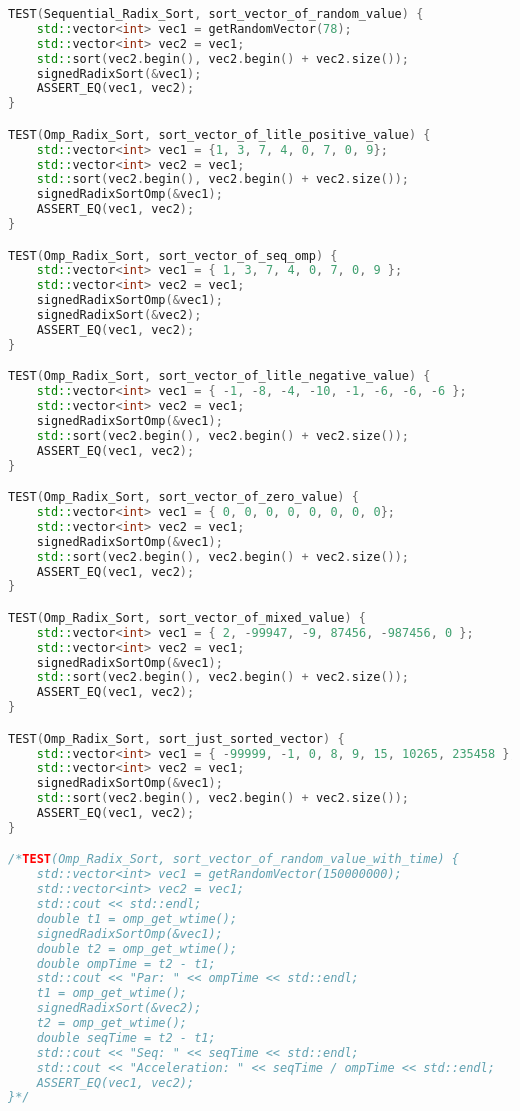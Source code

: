\documentclass{report}
\begin{document}
\begin{lstlisting}[language=C++]
TEST(Sequential_Radix_Sort, sort_vector_of_random_value) {
    std::vector<int> vec1 = getRandomVector(78);
    std::vector<int> vec2 = vec1;
    std::sort(vec2.begin(), vec2.begin() + vec2.size());
    signedRadixSort(&vec1);
    ASSERT_EQ(vec1, vec2);
}

TEST(Omp_Radix_Sort, sort_vector_of_litle_positive_value) {
    std::vector<int> vec1 = {1, 3, 7, 4, 0, 7, 0, 9};
    std::vector<int> vec2 = vec1;
    std::sort(vec2.begin(), vec2.begin() + vec2.size());
    signedRadixSortOmp(&vec1);
    ASSERT_EQ(vec1, vec2);
}

TEST(Omp_Radix_Sort, sort_vector_of_seq_omp) {
    std::vector<int> vec1 = { 1, 3, 7, 4, 0, 7, 0, 9 };
    std::vector<int> vec2 = vec1;
    signedRadixSortOmp(&vec1);
    signedRadixSort(&vec2);
    ASSERT_EQ(vec1, vec2);
}

TEST(Omp_Radix_Sort, sort_vector_of_litle_negative_value) {
    std::vector<int> vec1 = { -1, -8, -4, -10, -1, -6, -6, -6 };
    std::vector<int> vec2 = vec1;
    signedRadixSortOmp(&vec1);
    std::sort(vec2.begin(), vec2.begin() + vec2.size());
    ASSERT_EQ(vec1, vec2);
}

TEST(Omp_Radix_Sort, sort_vector_of_zero_value) {
    std::vector<int> vec1 = { 0, 0, 0, 0, 0, 0, 0, 0};
    std::vector<int> vec2 = vec1;
    signedRadixSortOmp(&vec1);
    std::sort(vec2.begin(), vec2.begin() + vec2.size());
    ASSERT_EQ(vec1, vec2);
}

TEST(Omp_Radix_Sort, sort_vector_of_mixed_value) {
    std::vector<int> vec1 = { 2, -99947, -9, 87456, -987456, 0 };
    std::vector<int> vec2 = vec1;
    signedRadixSortOmp(&vec1);
    std::sort(vec2.begin(), vec2.begin() + vec2.size());
    ASSERT_EQ(vec1, vec2);
}

TEST(Omp_Radix_Sort, sort_just_sorted_vector) {
    std::vector<int> vec1 = { -99999, -1, 0, 8, 9, 15, 10265, 235458 };
    std::vector<int> vec2 = vec1;
    signedRadixSortOmp(&vec1);
    std::sort(vec2.begin(), vec2.begin() + vec2.size());
    ASSERT_EQ(vec1, vec2);
}

/*TEST(Omp_Radix_Sort, sort_vector_of_random_value_with_time) {
    std::vector<int> vec1 = getRandomVector(150000000);
    std::vector<int> vec2 = vec1;
    std::cout << std::endl;
    double t1 = omp_get_wtime();
    signedRadixSortOmp(&vec1);
    double t2 = omp_get_wtime();
    double ompTime = t2 - t1;
    std::cout << "Par: " << ompTime << std::endl;
    t1 = omp_get_wtime();
    signedRadixSort(&vec2);
    t2 = omp_get_wtime();
    double seqTime = t2 - t1;
    std::cout << "Seq: " << seqTime << std::endl;
    std::cout << "Acceleration: " << seqTime / ompTime << std::endl;
    ASSERT_EQ(vec1, vec2);
}*/


\end{lstlisting}
\end{document}
